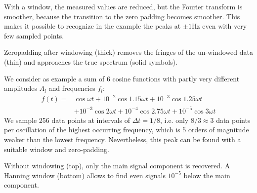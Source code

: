 With a window, the measured values are reduced, but the Fourier
transform is smoother, because the transition to the
zero padding becomes smoother. This makes it possible to recognize in the example the peaks at $\pm 1$Hz
even with very few sampled points. 

\begin{marginfigure}
  \caption{Zeropadding after windowing (thick) removes the fringes of the un-windowed data (thin) and approaches the true spectrum (solid symbols).}
  \label{fig:1_zeropadding_window}
\end{marginfigure}






We consider as example a sum of 6 cosine functions with partly very different amplitudes $A_l$ and frequencies $f_l$:
\begin{align}
  f(t) = & \cos \omega t + 10^{-2} \cos 1.15 \omega t  + 10^{-3} \cos 1.25 \omega t \\
   & + 10^{-3} \cos 2 \omega t  + 10^{-4} \cos 2.75 \omega t + 10^{-5} \cos 3 \omega t \nonumber
\end{align}
We sample 256 data points at intervals of $\Delta t = 1/8$, i.e. only
$8/3 \approx 3$ data points per oscillation of the highest occurring frequency, which is 5 orders of magnitude weaker than the lowest frequency.
Nevertheless, this peak can be found with a suitable window and
zero-padding.  



\begin{marginfigure}

  
  \caption{Without windowing (top), only the main signal component is recovered. A Hanning window (bottom) allows to find even signals $10^{-5}$ below the main component.}
  \label{fig:1_example_windowing}
\end{marginfigure}



\printbibliography[segment=\therefsegment,heading=subbibliography]
